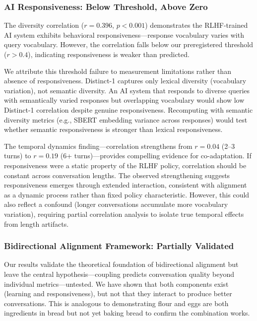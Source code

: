 \subsubsection{AI Responsiveness: Below Threshold, Above Zero}

The diversity correlation ($r=0.396$, $p<0.001$) demonstrates the RLHF-trained AI system exhibits behavioral responsiveness---response vocabulary varies with query vocabulary. However, the correlation falls below our preregistered threshold ($r>0.4$), indicating responsiveness is weaker than predicted.

We attribute this threshold failure to measurement limitations rather than absence of responsiveness. Distinct-1 captures only lexical diversity (vocabulary variation), not semantic diversity. An AI system that responds to diverse queries with semantically varied responses but overlapping vocabulary would show low Distinct-1 correlation despite genuine responsiveness. Recomputing with semantic diversity metrics (e.g., SBERT embedding variance across responses) would test whether semantic responsiveness is stronger than lexical responsiveness.

The temporal dynamics finding---correlation strengthens from $r=0.04$ (2--3 turns) to $r=0.19$ (6+ turns)---provides compelling evidence for co-adaptation. If responsiveness were a static property of the RLHF policy, correlation should be constant across conversation lengths. The observed strengthening suggests responsiveness emerges through extended interaction, consistent with alignment as a dynamic process rather than fixed policy characteristic. However, this could also reflect a confound (longer conversations accumulate more vocabulary variation), requiring partial correlation analysis to isolate true temporal effects from length artifacts.

\subsubsection{Bidirectional Alignment Framework: Partially Validated}

Our results validate the theoretical foundation of bidirectional alignment but leave the central hypothesis---coupling predicts conversation quality beyond individual metrics---untested. We have shown that both components exist (learning and responsiveness), but not that they interact to produce better conversations. This is analogous to demonstrating flour and eggs are both ingredients in bread but not yet baking bread to confirm the combination works.

